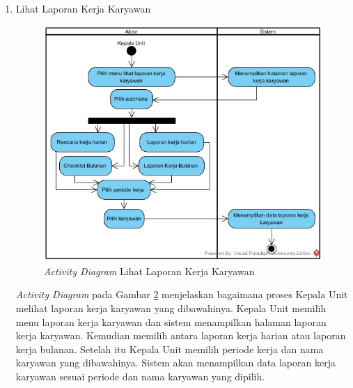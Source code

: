\begin{enumerate}
\begin{enumerate}[label=\alph*.]
\begin{figure}[H]
                		    \caption{\emph{Activity Diagram} Input Laporan Kerja Bulanan}
                		    \label{activity_input_lb}
                		\end{figure}
                		\emph{Activity Diagram} pada Gambar \ref{activity_input_lb} menjelaskan bagaimana proses karyawan melakukan input data laporan kerja bulanan (LB). Karyawan memilih menu LB dan sistem akan menampilkan halaman data LB. Kemudian karyawan memilih input LB dan sistem akan menampilkan \emph{form} input LB. Karyawan memilih periode kerja dan sistem akan melakukan pengecekan data CB sudah ada atau belum. Apabila data CB sudah ada, sistem akan menampilkan data CB yang siap diisi LB-nya. Sistem akan melakukan validasi sebelum data LB disimpan ke dalam \emph{database}.\newpage
                		\item Lihat Laporan Kerja Karyawan
                		\begin{figure}[H]
            		        \centering            		    \includegraphics[width=13cm]{gambar/activity/lihat-laporan-kerja-pegawai}
            		        \caption{\emph{Activity Diagram} Lihat Laporan Kerja Karyawan}
            		        \label{activity_lihat_laporan_kerja}
            		    \end{figure}
            		    \emph{Activity Diagram} pada Gambar \ref{activity_lihat_laporan_kerja} menjelaskan bagaimana proses Kepala Unit melihat laporan kerja karyawan yang dibawahinya. Kepala Unit memilih menu laporan kerja karyawan dan sistem menampilkan halaman laporan kerja karyawan. Kemudian memilih antara laporan kerja harian atau laporan kerja bulanan. Setelah itu Kepala Unit memilih periode kerja dan nama karyawan yang dibawahinya. Sistem akan menampilkan data laporan kerja karyawan sesuai periode dan nama karyawan yang dipilih.\newpage
            		\end{enumerate}
            	

\end{enumerate}
